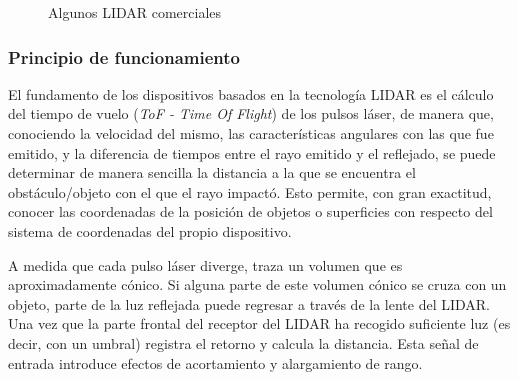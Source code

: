 \begin{figure}[!b]
    \centering
    \qquad
    \caption{Algunos LIDAR comerciales}
    \label{fig:lidars}
\end{figure}

\subsubsection{Principio de funcionamiento}
El  fundamento de los dispositivos basados en la tecnología LIDAR es el cálculo del tiempo de vuelo (\textit{ToF - Time  Of Flight}) de los pulsos láser, de manera que, conociendo la velocidad del mismo, las características angulares con las que fue emitido, y la diferencia de tiempos entre el rayo emitido y el reflejado, se puede determinar de manera sencilla la distancia a la que se encuentra el obstáculo/objeto con el que el rayo impactó. Esto permite, con gran exactitud, conocer las coordenadas de la posición de objetos o superficies con respecto del sistema de coordenadas del propio dispositivo.

A medida que cada pulso láser diverge, traza un volumen que es aproximadamente cónico. Si alguna parte de este volumen cónico se cruza con un objeto, parte de la luz reflejada puede regresar a través de la lente del LIDAR. Una vez que la parte frontal del receptor del LIDAR ha recogido suficiente luz (es decir, con un umbral) registra el retorno y calcula la distancia. Esta señal de entrada introduce efectos de acortamiento y alargamiento de rango.

